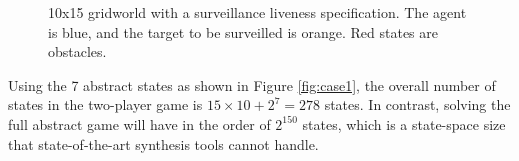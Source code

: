 \begin{figure}
\hfill
{}

\caption{10x15 gridworld with a surveillance liveness specification. The agent is blue, and the target to be surveilled is orange. Red states are obstacles.}
\label{fig:casestudies}

\end{figure}



Using the 7 abstract states as shown in Figure \ref{fig:case1}, the overall number of states in the two-player game is $15\times10 + 2^7 = 278$ states. In contrast, solving the full abstract game will have in the order of $2^{150}$ states, which is a state-space size that state-of-the-art synthesis tools cannot handle. 

